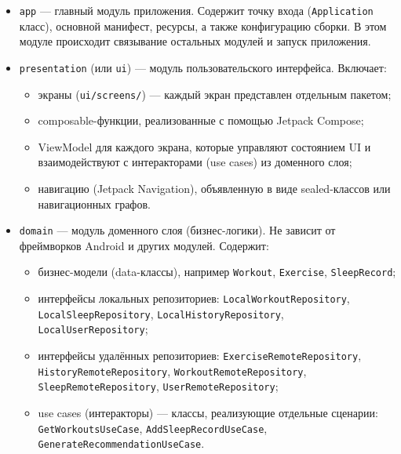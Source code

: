 \begin{itemize}
    \item \texttt{app} — главный модуль приложения. Содержит точку входа (\texttt{Application} класс), основной манифест, ресурсы, а также конфигурацию сборки. В этом модуле происходит связывание остальных модулей и запуск приложения.
    
    \item \texttt{presentation} (или \texttt{ui}) — модуль пользовательского интерфейса. Включает:
        \begin{itemize}
            \item экраны (\texttt{ui/screens/}) — каждый экран представлен отдельным пакетом;
            \item composable-функции, реализованные с помощью Jetpack Compose;
            \item ViewModel для каждого экрана, которые управляют состоянием UI и взаимодействуют с интеракторами (use cases) из доменного слоя;
            \item навигацию (Jetpack Navigation), объявленную в виде sealed-классов или навигационных графов.
        \end{itemize}
    
    \item \texttt{domain} — модуль доменного слоя (бизнес-логики). Не зависит от фреймворков Android и других модулей. Содержит:
        \begin{itemize}
            \item бизнес-модели (data-классы), например \texttt{Workout}, \texttt{Exercise}, \texttt{SleepRecord};
            \item интерфейсы локальных репозиториев: \texttt{LocalWorkoutRepository}, \texttt{LocalSleepRepository}, \texttt{LocalHistoryRepository}, \texttt{LocalUserRepository};
            \item интерфейсы удалённых репозиториев: \texttt{ExerciseRemoteRepository}, \texttt{HistoryRemoteRepository}, \texttt{WorkoutRemoteRepository}, \texttt{SleepRemoteRepository}, \texttt{UserRemoteRepository};
            \item use cases (интеракторы) — классы, реализующие отдельные сценарии: \texttt{GetWorkoutsUseCase}, \texttt{AddSleepRecordUseCase}, \texttt{GenerateRecommendationUseCase}.
        \end{itemize}
    

\end{itemize}
